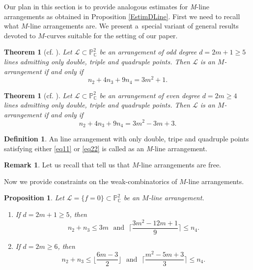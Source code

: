 \documentclass[12pt]{article}
\theoremstyle{plain}
\newtheorem{theorem}[thm]{Theorem}
\newtheorem{proposition}[thm]{Proposition}
\theoremstyle{definition}
\newtheorem{definition}[thm]{Definition}
\newtheorem{remark}[thm]{Remark}
\begin{document}
Our plan in this section is to provide analogous estimates for {\it M}-line arrangements as obtained in Proposition \ref{EstimDLine}. First we need to recall what $M$-line arrangements are. We present a~special variant of general results devoted to $M$-curves suitable for the setting of our paper.
\begin{theorem}[{cf. \cite[Theorem 4.8]{JanLes}}]\label{JanLes2dOne}
Let $\mathcal{L} \subset \mathbb{P}^{2}_{\mathbb{C}}$ be an arrangement of odd degree $d=2m+1\geq 5$ lines admitting only double, triple and quadruple points. Then $\mathcal{L}$ is an $M$-arrangement if and only if 
\begin{equation}
\label{eq11}
n_{2} + 4n_{3}+9n_{4} = 3m^{2}+1. 
\end{equation}
\end{theorem}

\begin{theorem}[{cf. \cite[Theorem 4.3]{JanLes}}]\label{JanLes2d}
\label{Mce}
Let $\mathcal{L} \subset \mathbb{P}^{2}_{\mathbb{C}}$ be an arrangement of even degree $d=2m\geq 4$ lines admitting only double, triple and quadruple points. Then $\mathcal{L}$ is an $M$-arrangement if and only if 
\begin{equation}
\label{eq22}
n_{2} + 4n_{3}+9n_{4} = 3m^{2}-3m+3.
\end{equation}
\end{theorem}
\begin{definition}
An line arrangement with only double, tripe and quadruple points satisfying either \eqref{eq11} or \eqref{eq22} is called as an {\it M}-line arrangement.
\end{definition}
\begin{remark}
Let us recall that \cite[Theorem 4.3 and 4.8]{JanLes} tell us that $M$-line arrangements are free.
\end{remark}
Now we provide constraints on the weak-combinatorics of $M$-line arrangements.
\begin{proposition}
Let $\mathcal{L} = \{f = 0\}\subset\mathbb{P}^2_{\mathbb{C}}$ be an 
$M$-line arrangement. 
\begin{enumerate}
\item[a)] If $d=2m+1 \geq 5$, then 
\begin{equation}
\label{cm2}
n_2+n_3\leq 3m \:\:\:\text{and}\:\:\:  
\bigg\lceil\frac{3m^2-12m+1}{9}\bigg\rceil\leq n_4. 
\end{equation}
\item[b)] If $d=2m \geq 6$, then 
\begin{equation}
    n_2+n_3\leq \bigg\lfloor\frac{6m-3}{2}\bigg\rfloor \:\:\:\text{and}\:\:\:  
\bigg\lceil\frac{m^2-5m+3}{3}\bigg\rceil\leq n_4. 
\end{equation}
\end{enumerate}
\end{proposition}
\end{document}
